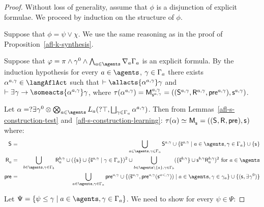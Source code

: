\begin{proof}
Without loss of generality, assume that $\phi$ is a disjunction of explicit formulae.
We proceed by induction on the structure of $\phi$.

Suppose that $\phi = \psi \lor \chi$. We use the same reasoning as in the proof of Proposition~\ref{afl-k-synthesis}.

Suppose that $\phi = \pi \land \gamma^0 \land \bigwedge_{\agentA \in \agents} \coversA \Gamma_\agentA$ is an explicit formula.
By the induction hypothesis for every $\agentA \in \agents$, $\gamma \in \Gamma_a$ there exists $\alpha^{\agentA,\gamma} \in \langAflAct$ such that $\proves \allacts{\alpha^{\agentA,\gamma}} \gamma$ and $\proves \somerefs \gamma \implies \someacts{\alpha^{\agentA,\gamma}} \gamma$, where $\tau(\alpha^{\agentA,\gamma}) = \aPModel[\agentA,\gamma]{\aStateS[\agentA,\gamma]} = \aPModelTuple[\agentA,\gamma]{\aStateS[\agentA,\gamma]}$.

Let $\alpha = \test{\somerefs \gamma^0} \compose \bigcompose_{\agentA \in \agents} \learns_\agentA (\test{\top}, \bigchoice_{\gamma \in \Gamma_\agentA} \alpha^{\agentA,\gamma})$.
Then from Lemmas~\ref{afl-s-construction-test} and~\ref{afl-s-construction-learning}: $\tau(\alpha) \bisimilar \aPModel{\aStateS} = \aPModelTuple{\aStateS}$ where:
\begin{eqnarray*}
    \aStates &=& \bigcup_{\agentA \in \agents, \gamma \in \Gamma_\agentA} \aStates[\agentA,\gamma] \cup \{\aPStateS[\agentA,\gamma] \mid \agentA \in \agents, \gamma \in \Gamma_\agentA\} \cup \{\aStateS\}\\
    \aAccessibility{\agentA} &=& \bigcup_{\agentB \in \agents, \gamma \in \Gamma_\agentB} \aAccessibility[\agentB,\gamma]{\agentA} \cup (\{\aStateS\} \cup \{\aPStateS[\agentA,\gamma] \mid \gamma \in \Gamma_\agentA\})^2 \cup \bigcup_{\agentB \in \agents \setminus \{\agentA\}, \gamma \in \Gamma_\agentB} (\{\aPStateS[\agentB,\gamma]\} \cup \aStateS[\agentB,\gamma] \aAccessibility[\agentB,\gamma]{\agentA})^2 \text{ for } \agentA \in \agents\\
    \aPrecondition &=& \bigcup_{\agentA \in \agents, \gamma \in \Gamma_\agentA} \aPrecondition[\agentA,\gamma] \cup \{(\aPStateS[\agentA,\gamma], \aPrecondition[\agentA,\gamma](\aStateS[\agentA<,\gamma])) \mid \agentA \in \agents, \gamma \in \gamma_\agentA\} \cup \{(\aStateS, \somerefs \gamma^0)\}
\end{eqnarray*}

Let $\Psi = \{\psi \leq \gamma \mid \agentA \in \agents, \gamma \in \Gamma_\agentA\}$. We need to show for every $\psi \in \Psi$:


\end{proof}
